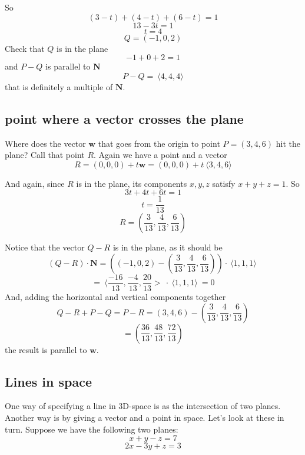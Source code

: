 \documentclass[11pt, oneside]{article}
\begin{document}
So
\[ (3-t) + (4-t) + (6-t) = 1 \]
\[ 13 -3t = 1\]
\[ t = 4 \]
\[ Q = (-1,0,2) \]
Check that $Q$ is in the plane
\[ -1 + 0 + 2 = 1 \]
and $P-Q$ is parallel to $\mathbf{N}$
\[ P - Q = \ \langle 4,4,4 \rangle \]
that is definitely a multiple of $\mathbf{N}$.

\subsection*{point where a vector crosses the plane}

Where does the vector $\mathbf{w}$ that goes from the origin to point $P=(3,4,6)$ hit the plane?  Call that point $R$.  Again we have a point and a vector 
\[ R = (0,0,0) + t \mathbf{w} = (0,0,0) + t \ \langle 3,4,6 \rangle \]

And again, since $R$ is in the plane, its components $x,y,z$ satisfy $x + y + z = 1$.  So
\[ 3t + 4t + 6t = 1 \]
\[ t = \frac{1}{13} \]
\[ R = (\frac{3}{13}, \frac{4}{13}, \frac{6}{13}) \]

Notice that the vector $Q-R$ is in the plane, as it should be
\[ (Q-R) \cdot \mathbf{N} =  ((-1,0,2) - (\frac{3}{13}, \frac{4}{13}, \frac{6}{13})) \cdot \ \langle 1,1,1 \rangle \ \]
\[ =  \ \langle \frac{-16}{13}, \frac{-4}{13}, \frac{20}{13}> \  \cdot  \ \langle 1,1,1 \rangle  \ = 0 \]
And, adding the horizontal and vertical components together
\[ Q - R + P - Q = P - R = (3,4,6) - (\frac{3}{13}, \frac{4}{13}, \frac{6}{13}) \]
\[ = (\frac{36}{13}, \frac{48}{13}, \frac{72}{13}) \]
the result is parallel to $\mathbf{w}$.

\subsection*{Lines in space}

One way of specifying a line in 3D-space is as the intersection of two planes.  Another way is by giving a vector and a point in space.  Let's look at these in turn.
\noindent
Suppose we have the following two planes:
\[ x + y - z = 7 \]
\[2x - 3y + z = 3 \]
\end{document}
